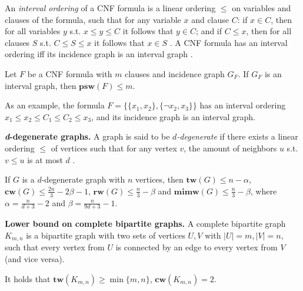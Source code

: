 \noindent
An {\em interval ordering} of a CNF formula is a linear ordering $\leq $ on variables and clauses of the formula, such that for any variable $x$ and clause $C$: if $x \in C$, then for all variables $y$ s.t. $x \leq y \leq C$ it follows that $y \in C$; and if $C \leq x$, then for all clauses $S$ s.t. $C \leq S \leq x$ it follows that $x \in S$ \cite{DBLP:conf/sat/SaetherTV14}.
A CNF formula has an interval ordering iff its incidence graph is an interval graph \cite{DBLP:conf/sat/SaetherTV14}.

\begin{fact}
	Let $F$ be a CNF formula with $m$ clauses and incidence graph $G_F$.
	If $G_F$ is an interval graph, then $\mathbf{psw}(F) \leq m$.
	\label{fact:psw-interval}
\end{fact}

\noindent
As an example, the formula $F=\{ \{x_1, x_2\}, \{\neg x_2, x_3\} \}$ has an interval ordering $x_1 \leq x_2 \leq C_1 \leq C_2 \leq x_3$, and its incidence graph is an interval graph.

\textbf{{\em d}-degenerate graphs.}
A graph is said to be {\em $d$-degenerate} if there exists a linear ordering $\leq$ of vertices such that for any vertex $v$, the amount of neighbors $u$ s.t. $v \leq u$ is at most $d$ \cite{PhD:Vatshelle}.

\begin{fact}
	If $G$ is a $d$-degenerate graph with $n$ vertices, then $\mathbf{tw}(G) \leq n - \alpha$, $\mathbf{cw}(G) \leq \frac{2n}{3} - 2\beta - 1$, $\mathbf{rw}(G) \leq \frac{n}{3} - \beta$ and $\mathbf{mimw}(G) \leq \frac{n}{3} - \beta$, where $\alpha = \frac{n}{d + 3} - 2$ and $\beta = \frac{n}{9d+3} - 1$.
\end{fact}

\textbf{Lower bound on complete bipartite graphs.}
A complete bipartite graph $K_{m,n}$ is a bipartite graph with two sets of vertices $U, V$ with $|U|=m, |V|=n$, such that every vertex from $U$ is connected by an edge to every vertex from $V$ (and vice versa).

\begin{fact}[folklore]
		It holds that $\mathbf{tw}(K_{m,n}) \geq \min \{m,n\}$, $\mathbf{cw}(K_{m,n})=2$.
\end{fact}


